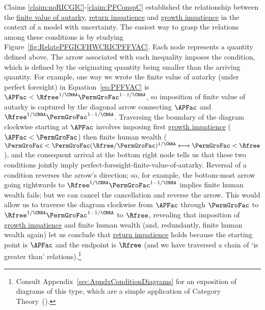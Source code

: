 \documentclass[BufferStockTheory]{subfiles}
\begin{document}
Claims \ref{claim:noRICGIC}-\ref{claim:PFConspC} established the relationship between the \hyperlink{PF-FVAC}{finite value of autarky}, \hyperlink{RIC}{return impatience} and \hyperlink{GIC}{growth impatience} in the context of a model with uncertainty. The easiest way to grasp the relations among these conditions is by studying Figure~\ref{fig:RelatePFGICFHWCRICPFFVAC}.  Each node represents a quantity defined above.  The arrow associated with each inequality imposes the condition, which is defined by the originating quantity being smaller than the arriving quantity.  For example, one way we wrote the \hypertarget{PFFVAC}{finite value of autarky} (under perfect foresight) in Equation~\eqref{eq:PFFVAC} is $\APFac < \Rfree^{1/\CRRA} \PermGroFac^{1-1/\CRRA}$, so imposition of \hypertarget{PFFVAC}{finite value of autarky} is captured by the diagonal arrow connecting $\APFac$ and $\Rfree^{1/\CRRA}\PermGroFac^{1-1/\CRRA}$.  Traversing the boundary of the diagram clockwise starting at $\APFac$ involves imposing first \hyperlink{GICRaw}{growth impatience} ($\APFac < \PermGroFac$) then \hypertarget{FHWC}{finite human wealth} ($\PermGroFac < \PermGroFac(\Rfree/\PermGroFac)^{1/\CRRA} \longleftrightarrow \PermGroFac < \Rfree $), and the consequent arrival at the bottom right node tells us that these two conditions jointly imply \hypertarget{PFFVAC}{perfect-foresight-finite-value-of-autarky}.  Reversal of a condition reverses the arrow's direction; so, for example, the bottom-most arrow going rightwards to $\Rfree^{1/\CRRA}\PermGroFac^{1-1/\CRRA}$ implies  \hypertarget{FHWC}{finite human wealth} fails; but we can cancel the cancellation and reverse the arrow.  This would allow us to traverse the diagram clockwise from $\APFac$  through $\PermGroFac$ to $\Rfree^{1/\CRRA}\PermGroFac^{1-1/\CRRA}$ to $\Rfree$, revealing that imposition of \hyperlink{GICRaw}{growth impatience} and \hypertarget{FHWC}{finite human wealth} (and, redundantly, \hypertarget{FHWC}{finite human wealth} again) let us conclude that \hyperlink{RIC}{return impatience} holds because the starting point is $\APFac$ and the endpoint is $\Rfree$ (and we have traversed a chain of `is greater than' relations).\footnote{Consult Appendix~\ref{sec:ApndxConditionDiagrams} for an exposition of diagrams of this type, which are a simple application of Category Theory~(\cite{riehl2017category}).}

\renewcommand{\figName}{RelatePFGICFHWCRICPFFVAC} 
\hypertarget{\figName}{}
\end{document}
